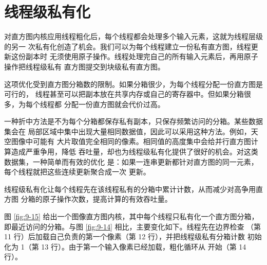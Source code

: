 \section{线程级私有化}
\label{sec:histogram-thread-level-privatization}

对直方图内核应用线程粗化后，每个线程都会处理多个输入元素，这就为线程层级的另一
次私有化创造了机会。我们可以为每个线程建立一份私有直方图，线程更新这份副本时
无须使用原子操作。线程处理完自己的所有输入元素后，再用原子操作把线程级私有
直方图提交到块级私有直方图。

这项优化受到直方图分箱数的限制。如果分箱很少，为每个线程分配一份直方图是可行的，
线程甚至可以把副本放在共享内存或自己的寄存器中。但如果分箱很多，为每个线程都
分配一份直方图就会代价过高。

一种折中方法是不为每个分箱都保存私有副本，只保存频繁访问的分箱。某些数据集会在
局部区域中集中出现大量相同数据值，因此可以采用这种方法。例如，天空图像中可能有
大片取值完全相同的像素。相同值的高度集中会给并行直方图计算造成严重争用，降低
吞吐量，却也为线程级私有化提供了很好的机会。对这类数据集，一种简单而有效的优化
是：如果一连串更新都针对直方图的同一元素，每个线程就把这些连续更新聚合成一次
更新。

线程级私有化让每个线程先在该线程私有的分箱中累计计数，从而减少对高争用直方图
分箱的原子操作次数，提高计算的有效吞吐量。

图 \ref{fig:9-15} 给出一个图像直方图内核，其中每个线程只私有化一个直方图分箱，
即最近访问的分箱。与图 \ref{fig:9-14} 相比，主要变化如下。线程先在边界检查
（第 11 行）后加载自己负责的第一个像素（第 12 行），并把线程级私有分箱计数
 初始化为 1（第 13 行）。由于第一个输入像素已经加载，粗化循环从
 开始（第 14 行）。


